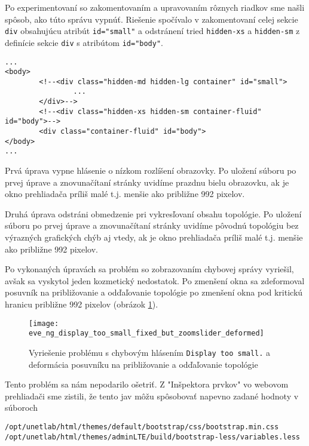 Po experimentovaní so zakomentovaním a upravovaním rôznych riadkov sme našli spôsob, ako túto správu vypnúť. Riešenie spočívalo v zakomentovaní celej sekcie \texttt{div} obsahujúcu atribút \texttt{id="small"} a odstránení tried \texttt{hidden-xs} a \texttt{hidden-sm} z definície sekcie \texttt{div} s atribútom \texttt{id="body"}.

\begin{verbatim}
...
<body>
        <!--<div class="hidden-md hidden-lg container" id="small">
                ...
        </div>-->
        <!--<div class="hidden-xs hidden-sm container-fluid" id="body">-->
        <div class="container-fluid" id="body">
</body>
...
\end{verbatim}

Prvá úprava vypne hlásenie o nízkom rozlíšení obrazovky. Po uložení súboru po prvej úprave a znovunačítaní stránky uvidíme prazdnu bielu obrazovku, ak je okno prehliadača príliš malé t.j. menšie ako približne 992 pixelov.

Druhá úprava odstráni obmedzenie pri vykresľovaní obsahu topológie. Po uložení súboru po prvej úprave a znovunačítaní stránky uvidíme pôvodnú topológiu bez výrazných grafických chýb aj vtedy, ak je okno prehliadača príliš malé t.j. menšie ako približne 992 pixelov.

Po vykonaných úpravách sa problém so zobrazovaním chybovej správy vyriešil, avšak sa vyskytol jeden kozmetický nedostatok. Po zmenšení okna sa zdeformoval posuvník na približovanie a odďaľovanie topológie po zmenšení okna pod kritickú hranicu približne 992 pixelov (obrázok \ref{obr:eve_ng_display_too_small_fixed_but_zoomslider_deformed}).

\begin{figure}
    \centering
    \texttt{[image: eve\_ng\_display\_too\_small\_fixed\_but\_zoomslider\_deformed]}
    \caption{Vyriešenie problému s chybovým hlásením \texttt{Display too small.} a deformácia posuvníku na približovanie a odďaľovanie topológie}
    \label{obr:eve_ng_display_too_small_fixed_but_zoomslider_deformed}
\end{figure}

Tento problém sa nám nepodarilo ošetriť. Z "Inšpektora prvkov" vo webovom prehliadači sme zistili, že tento jav môžu spôsobovať napevno zadané hodnoty v súboroch
\begin{verbatim}
/opt/unetlab/html/themes/default/bootstrap/css/bootstrap.min.css
/opt/unetlab/html/themes/adminLTE/build/bootstrap-less/variables.less
\end{verbatim}

